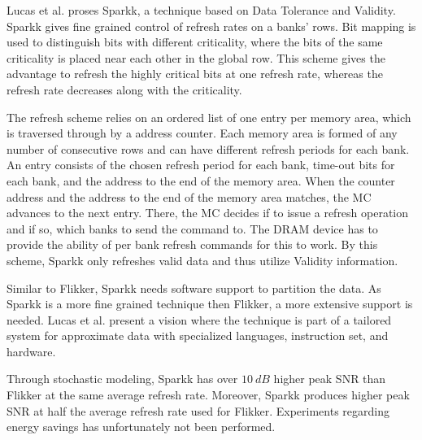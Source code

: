 Lucas et al. \cite{sparkk} proses Sparkk, a technique based on Data Tolerance and Validity. Sparkk gives fine grained control of refresh rates on a banks' rows. Bit mapping is used to distinguish bits with different criticality, where the bits of the same criticality is placed near each other in the global row. This scheme gives the advantage to refresh the highly critical bits at one refresh rate, whereas the refresh rate decreases along with the criticality. 

The refresh scheme relies on an ordered list of one entry per memory area, which is traversed through by a address counter. Each memory area is formed of any number of consecutive rows and can have different refresh periods for each bank. An entry consists of the chosen refresh period for each bank, time-out bits for each bank, and the address to the end of the memory area. When the counter address and the address to the end of the memory area matches, the MC advances to the next entry. There, the MC decides if to issue a refresh operation and if so, which banks to send the command to. The DRAM device has to provide the ability of per bank refresh commands for this to work. By this scheme, Sparkk only refreshes valid data and thus utilize Validity information. 

Similar to Flikker, Sparkk needs software support to partition the data. As Sparkk is a more fine grained technique then Flikker, a more extensive support is needed. Lucas et al. present a vision where the technique is part of a tailored system for approximate data with specialized languages, instruction set, and hardware. 

Through stochastic modeling, Sparkk has over $10~dB$ higher peak SNR than Flikker at the same average refresh rate. Moreover, Sparkk produces higher peak SNR at half the average refresh rate used for Flikker. Experiments regarding energy savings has unfortunately not been performed. 
